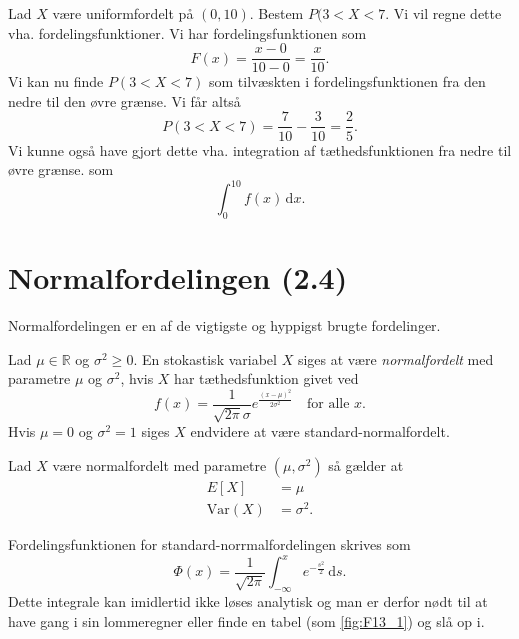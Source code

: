 \begin{eks} [Uniformfordeling]
  Lad $X$ være uniformfordelt på $(0, 10)$. Bestem $P(3 < X < 7$.
  \bigbreak
  Vi vil regne dette vha. fordelingsfunktioner. Vi har fordelingsfunktionen som
  \[ 
  F(x) = \frac{x-0}{10 - 0} = \frac{x}{10}
  .\]
  Vi kan nu finde $P(3 < X < 7)$ som tilvæskten i fordelingsfunktionen fra den nedre til den øvre grænse. Vi får altså
  \[ 
  P(3 < X < 7) = \frac{7}{10} - \frac{3}{10} = \frac{2}{5}
  .\]
  Vi kunne også have gjort dette vha. integration af tæthedsfunktionen fra nedre til øvre grænse. som
  \[ 
  \int_{0}^{10} f(x) \, \mathrm{d}x 
  .\]
\end{eks}

\section{Normalfordelingen (2.4)}
Normalfordelingen er en af de vigtigste og hyppigst brugte fordelinger.

\begin{definition} [Normalfordeling]
  Lad $\mu \in \mathbb{R}$ og $\sigma^2 \geq 0$. En stokastisk variabel $X$ siges at være \textit{normalfordelt} med parametre $\mu$ og $\sigma^2$, hvis $X$ har tæthedsfunktion givet ved
  \[ 
  f(x) = \frac{1}{\sqrt{2\pi}\sigma}e^{\frac{(x-\mu)^2}{2\sigma^2}} \quad \text{for alle } x
  .\]
  Hvis $\mu = 0$ og $\sigma^2 = 1$ siges $X$ endvidere at være standard-normalfordelt.
\end{definition}

\begin{sæt} 
  Lad $X$ være normalfordelt med parametre $\left(\mu, \sigma^2\right)$ så gælder at
  \begin{align*}
    E[X] &= \mu \\
    \mathrm{Var}(X) &= \sigma^2
  .\end{align*}
\end{sæt}

\begin{sæt} 
  Fordelingsfunktionen for standard-norrmalfordelingen skrives som
  \[ 
  \Phi(x) = \frac{1}{\sqrt{2\pi}} \int_{-\infty}^{x} e^{-\frac{s^2}{2}} \, \mathrm{d}s
  .\]
  Dette integrale kan imidlertid ikke løses analytisk og man er derfor nødt til at have gang i sin lommeregner eller finde en tabel (som \autoref{fig:F13_1}) og slå op i.
\end{sæt}

